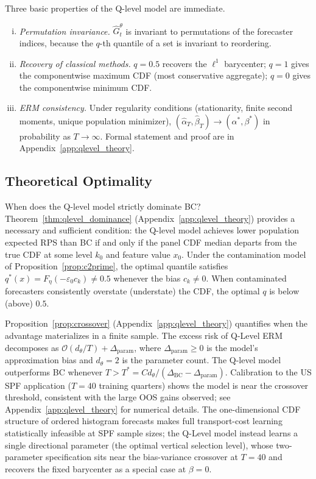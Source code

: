 Three basic properties of the Q-level model are immediate.
\begin{enumerate}[(i)]
\item \textit{Permutation invariance.} $\hat{G}_t^\theta$ is invariant to permutations of the
  forecaster indices, because the $q$-th quantile of a set is invariant to reordering.
\item \textit{Recovery of classical methods.} $q = 0.5$ recovers the $\ell^1$ barycenter;
  $q = 1$ gives the componentwise maximum CDF (most conservative aggregate);
  $q = 0$ gives the componentwise minimum CDF.
\item \textit{ERM consistency.} Under regularity conditions (stationarity, finite second moments,
  unique population minimizer), $(\hat\alpha_T, \hat\beta_T) \to (\alpha^*, \beta^*)$ in
  probability as $T \to \infty$. Formal statement and proof are in Appendix~\ref{app:qlevel_theory}.
\end{enumerate}

\subsection{Theoretical Optimality}
\label{sec:qlevel_theory_main}

When does the Q-level model strictly dominate BC?
Theorem~\ref{thm:qlevel_dominance} (Appendix~\ref{app:qlevel_theory}) provides a necessary
and sufficient condition: the Q-level model achieves lower population expected RPS than BC if
and only if the panel CDF median departs from the true CDF at some level $k_0$ and feature
value $x_0$.  Under the contamination model of Proposition~\ref{prop:c2prime}, the optimal
quantile satisfies $q^*(x) = F_\eta(-\varepsilon_0 c_k) \neq 0.5$ whenever the bias $c_k \neq 0$.
When contaminated forecasters consistently overstate (understate) the CDF, the optimal $q$
is below (above) $0.5$.

Proposition~\ref{prop:crossover} (Appendix~\ref{app:qlevel_theory}) quantifies when the
advantage materializes in a finite sample.  The excess risk of Q-Level ERM decomposes as
$\mathcal{O}(d_\theta / T) + \Delta_{\mathrm{param}}$, where $\Delta_{\mathrm{param}} \geq 0$
is the model's approximation bias and $d_\theta = 2$ is the parameter count.  The Q-level model
outperforms BC whenever $T > T^* = C d_\theta / (\Delta_{\mathrm{BC}} - \Delta_{\mathrm{param}})$.
Calibration to the US SPF application ($T=40$ training quarters) shows the model is near the
crossover threshold, consistent with the large OOS gains observed; see Appendix~\ref{app:qlevel_theory}
for numerical details.
The one-dimensional CDF structure of ordered histogram forecasts makes full transport-cost learning
statistically infeasible at SPF sample sizes; the Q-Level model instead learns a single directional
parameter (the optimal vertical selection level), whose two-parameter specification sits near
the bias-variance crossover at $T=40$ and recovers the fixed barycenter as a special case at $\beta=0$.

